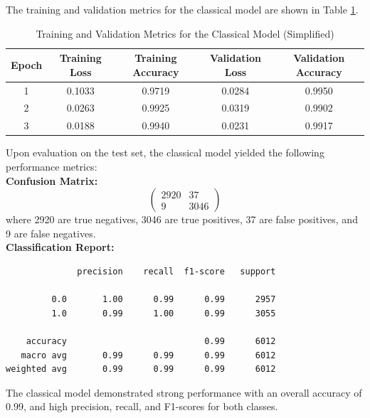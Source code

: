 \documentclass[10pt]{article}
\begin{document}
The training and validation metrics for the classical model are shown in Table \ref{tab:classical_model_metrics}.

\begin{table}[H]
    \centering
    \caption{Training and Validation Metrics for the Classical Model (Simplified)}
    \label{tab:classical_model_metrics}
    \begin{tabular}{|c|c|c|c|c|}
        \hline
        \textbf{Epoch} & \textbf{Training Loss} & \textbf{Training Accuracy} & \textbf{Validation Loss} & \textbf{Validation Accuracy} \\
        \hline
        1 & 0.1033 & 0.9719 & 0.0284 & 0.9950 \\
        2 & 0.0263 & 0.9925 & 0.0319 & 0.9902 \\
        3 & 0.0188 & 0.9940 & 0.0231 & 0.9917 \\
        \hline
    \end{tabular}
\end{table}

\noindent Upon evaluation on the test set, the classical model yielded the following performance metrics:\\
\textbf{Confusion Matrix:}
\[
\begin{pmatrix}
    2920 & 37 \\
    9 & 3046
\end{pmatrix}
\]
where 2920 are true negatives, 3046 are true positives, 37 are false positives, and 9 are false negatives.\\
\textbf{Classification Report:}
\begin{verbatim}
              precision    recall  f1-score   support

         0.0       1.00      0.99      0.99      2957
         1.0       0.99      1.00      0.99      3055

    accuracy                           0.99      6012
   macro avg       0.99      0.99      0.99      6012
weighted avg       0.99      0.99      0.99      6012
\end{verbatim}
The classical model demonstrated strong performance with an overall accuracy of 0.99, and high precision, recall, and F1-scores for both classes.\\
\end{document}
